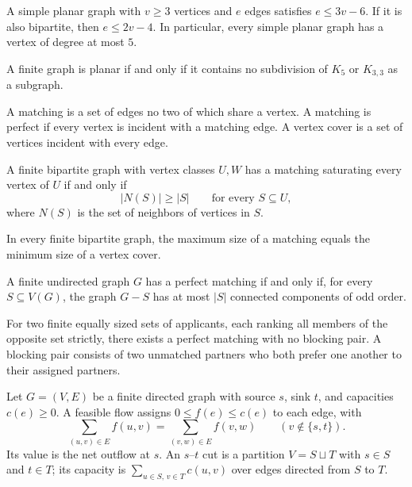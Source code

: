 \begin{theorem}
A simple planar graph with $v\ge3$ vertices and $e$ edges satisfies $e\le 3v-6$. If it is also bipartite, then $e\le 2v-4$. In particular, every simple planar graph has a vertex of degree at most $5$.
\end{theorem}

\begin{theorem}
A finite graph is planar if and only if it contains no subdivision of $K_5$ or $K_{3, 3}$ as a subgraph.
\end{theorem}

\begin{definition}
A matching is a set of edges no two of which share a vertex. A matching is perfect if every vertex is incident with a matching edge. A vertex cover is a set of vertices incident with every edge.
\end{definition}

\begin{theorem}
A finite bipartite graph with vertex classes $U, W$ has a matching saturating every vertex of $U$ if and only if
\[
 |N(S)|\ge |S|\qquad\text{for every }S\subseteq U,
\]
where $N(S)$ is the set of neighbors of vertices in $S$.
\end{theorem}

\begin{theorem}
In every finite bipartite graph, the maximum size of a matching equals the minimum size of a vertex cover.
\end{theorem}

\begin{theorem}
A finite undirected graph $G$ has a perfect matching if and only if, for every $S\subseteq V(G)$, the graph $G-S$ has at most $|S|$ connected components of odd order.
\end{theorem}

\begin{theorem}
For two finite equally sized sets of applicants, each ranking all members of the opposite set strictly, there exists a perfect matching with no blocking pair. A blocking pair consists of two unmatched partners who both prefer one another to their assigned partners.
\end{theorem}

\begin{definition}
Let $G=(V,E)$ be a finite directed graph with source $s$, sink $t$, and capacities $c(e)\ge0$. A feasible flow assigns $0\le f(e)\le c(e)$ to each edge, with
\[
 \sum_{(u,v)\in E}f(u,v)=\sum_{(v,w)\in E}f(v,w)
 \qquad(v\notin\{s,t\}).
\]
Its value is the net outflow at $s$. An $s$--$t$ cut is a partition $V=S\sqcup T$ with $s\in S$ and $t\in T$; its capacity is $\sum_{u\in S,\,v\in T}c(u,v)$ over edges directed from $S$ to $T$.
\end{definition}


